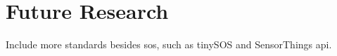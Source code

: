 
\chapter{Future Research}
\label{chap:futureResearch}

Include more standards besides \ac{sos}, such as tinySOS and SensorThings \ac{api}.